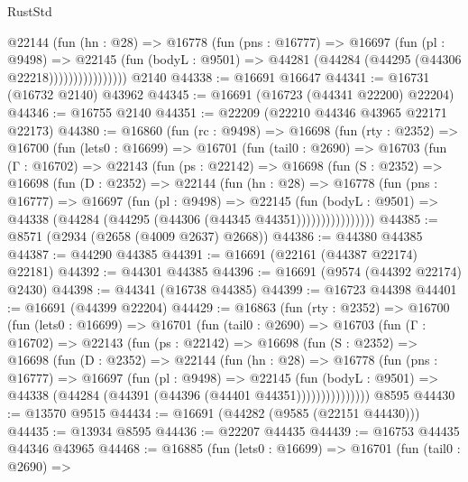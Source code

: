 \begin{lexlean}{RustStd}
\begin{coremodule}
                    @22144
                      (fun (hn : @28) =>
                      @16778
                        (fun (pns : @16777) =>
                        @16697
                          (fun (pl : @9498) =>
                          @22145
                            (fun (bodyL : @9501) =>
                            @44281 (@44284 (@44295 (@44306 @22218))))))))))))))))
    @2140
@44338 := @16691 @16647
@44341 := @16731 (@16732 @2140) @43962
@44345 := @16691 (@16723 (@44341 @22200) @22204)
@44346 := @16755 @2140
@44351 := @22209 (@22210 @44346 @43965 @22171 @22173)
@44380 := @16860
    (fun (rc : @9498) =>
    @16698
      (fun (rty : @2352) =>
      @16700
        (fun (lets0 : @16699) =>
        @16701
          (fun (tail0 : @2690) =>
          @16703
            (fun (Γ : @16702) =>
            @22143
              (fun (ps : @22142) =>
              @16698
                (fun (S : @2352) =>
                @16698
                  (fun (D : @2352) =>
                  @22144
                    (fun (hn : @28) =>
                    @16778
                      (fun (pns : @16777) =>
                      @16697
                        (fun (pl : @9498) =>
                        @22145
                          (fun (bodyL : @9501) =>
                          @44338 (@44284 (@44295 (@44306 (@44345 @44351))))))))))))))))
@44385 := @8571 (@2934 (@2658 (@4009 @2637) @2668))
@44386 := @44380 @44385
@44387 := @44290 @44385
@44391 := @16691 (@22161 (@44387 @22174) @22181)
@44392 := @44301 @44385
@44396 := @16691 (@9574 (@44392 @22174) @2430)
@44398 := @44341 (@16738 @44385)
@44399 := @16723 @44398
@44401 := @16691 (@44399 @22204)
@44429 := @16863
    (fun (rty : @2352) =>
    @16700
      (fun (lets0 : @16699) =>
      @16701
        (fun (tail0 : @2690) =>
        @16703
          (fun (Γ : @16702) =>
          @22143
            (fun (ps : @22142) =>
            @16698
              (fun (S : @2352) =>
              @16698
                (fun (D : @2352) =>
                @22144
                  (fun (hn : @28) =>
                  @16778
                    (fun (pns : @16777) =>
                    @16697
                      (fun (pl : @9498) =>
                      @22145
                        (fun (bodyL : @9501) =>
                        @44338 (@44284 (@44391 (@44396 (@44401 @44351)))))))))))))))
    @8595
@44430 := @13570 @9515
@44434 := @16691 (@44282 (@9585 (@22151 @44430)))
@44435 := @13934 @8595
@44436 := @22207 @44435
@44439 := @16753 @44435 @44346 @43965
@44468 := @16885
    (fun (lets0 : @16699) =>
    @16701
      (fun (tail0 : @2690) =>

\end{coremodule}
\end{lexlean}
